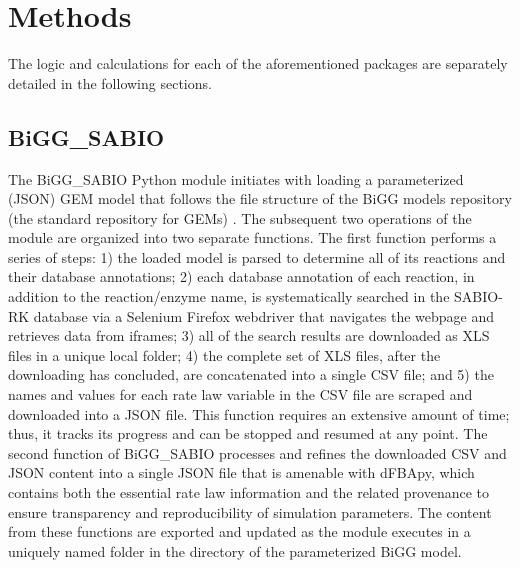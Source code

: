 \section{Methods}
The logic and calculations for each of the aforementioned packages are separately detailed in the following sections.

\subsection{BiGG\_SABIO}

The BiGG\_SABIO Python module initiates with loading a parameterized (JSON) GEM model that follows the file structure of the BiGG models repository (the standard repository for GEMs) \cite{King2016BiGGModels}. The subsequent two operations of the module are organized into two separate functions. The first function  performs a series of steps: 1) the loaded model is parsed to determine all of its reactions and their database annotations; 2) each database annotation of each reaction, in addition to the reaction/enzyme name, is systematically searched in the SABIO-RK database via a Selenium Firefox webdriver \cite{vandenBroucke2018PracticalScience,Nyamathulla2021APython} that navigates the webpage and retrieves data from iframes; 3) all of the search results are downloaded as XLS files in a unique local folder; 4) the complete set of XLS files, after the downloading has concluded, are concatenated into a single CSV file; and 5) the names and values for each rate law variable in the CSV file are scraped and downloaded into a JSON file. This function requires an extensive amount of time; thus, it tracks its progress and can be stopped and resumed at any point. The second function of BiGG\_SABIO  processes and refines the downloaded CSV and JSON content into a single JSON file that is amenable with dFBApy, which contains both the essential rate law information and the related provenance to ensure transparency and reproducibility of simulation parameters. The content from these functions are exported and updated as the module executes in a uniquely named folder in the directory of the parameterized BiGG model. 

